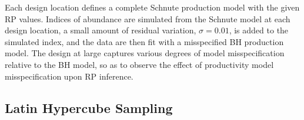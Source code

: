 %
Each design location defines a complete Schnute production model with the given 
RP values. Indices of abundance are simulated from the Schnute model at each design
location, a small amount of residual variation, $\sigma=0.01$, is added to the 
simulated index, and the data are then fit with a misspecified BH production model. 
The design at large captures various degrees of model misspecification relative 
to the BH model, so as to observe the effect of productivity model misspecification 
upon RP inference.


%

%
%
%
%


%
\subsection{Latin Hypercube Sampling \label{lhs}}

